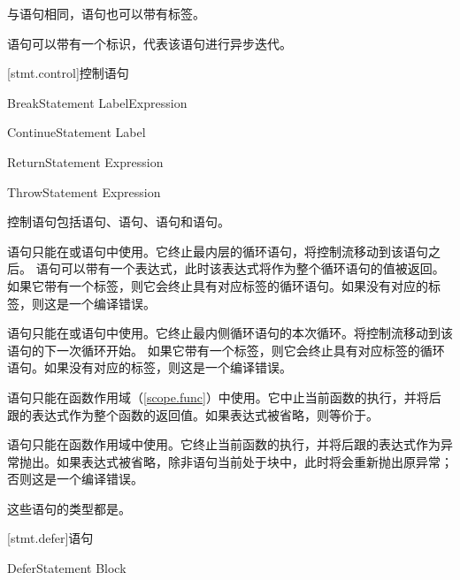 \pnum
与语句相同，语句也可以带有标签。

\pnum
{}语句可以带有一个标识，代表该语句进行异步迭代。

[stmt.control]{控制语句}

\begin{bnf}{BreakStatement}
     Label\bnfq Expression\bnfq
\end{bnf}

\begin{bnf}{ContinueStatement}
     Label\bnfq
\end{bnf}

\begin{bnf}{ReturnStatement}
     Expression\bnfq
\end{bnf}

\begin{bnf}{ThrowStatement}
     Expression\bnfq
\end{bnf}

\pnum
控制语句包括语句、语句、语句和语句。

\pnum
{}语句只能在或语句中使用。它终止最内层的循环语句，将控制流移动到该语句之后。
语句可以带有一个表达式，此时该表达式将作为整个循环语句的值被返回。
如果它带有一个标签，则它会终止具有对应标签的循环语句。如果没有对应的标签，则这是一个编译错误。

\pnum
{}语句只能在或语句中使用。它终止最内侧循环语句的本次循环。将控制流移动到该语句的下一次循环开始。
如果它带有一个标签，则它会终止具有对应标签的循环语句。如果没有对应的标签，则这是一个编译错误。

\pnum
{}语句只能在函数作用域（\ref{scope.func}）中使用。它中止当前函数的执行，并将后跟的表达式作为整个函数的返回值。如果表达式被省略，则等价于\tcode{()}。

\pnum
{}语句只能在函数作用域中使用。它终止当前函数的执行，并将后跟的表达式作为异常抛出。如果表达式被省略，除非语句当前处于块中，此时将会重新抛出原异常；否则这是一个编译错误。

\pnum
这些语句的类型都是。

[stmt.defer]{语句}

\begin{bnf}{DeferStatement}
     Block
\end{bnf}

